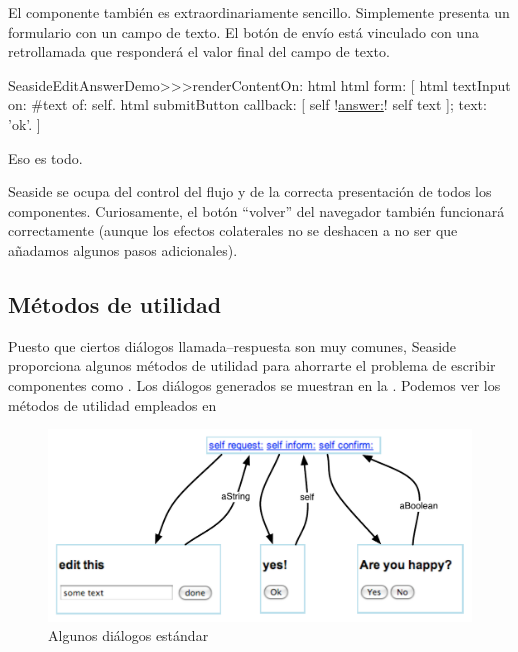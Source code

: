 \documentclass[a4paper,10pt,twoside]{book}
\begin{document}

El componente  también es extraordinariamente sencillo.
Simplemente presenta un formulario con un campo de texto.
El botón de envío está vinculado con una retrollamada que responderá el valor final del campo de texto.

\begin{code}{}
SeasideEditAnswerDemo>>>renderContentOn: html
	html form: [
		html textInput
			on: #text of: self.
		html submitButton
			callback: [ self !\underline{answer:}! self text ];
			text: 'ok'.
		]
\end{code}{}

Eso es todo.

Seaside se ocupa del control del flujo y de la correcta presentación de todos los componentes.
Curiosamente, el botón ``volver'' del navegador también funcionará correctamente (aunque los efectos colaterales no se deshacen a no ser que añadamos algunos pasos adicionales).

\subsection{Métodos de utilidad}

Puesto que ciertos diálogos llamada--respuesta son muy comunes, Seaside proporciona algunos métodos de utilidad para ahorrarte el problema de escribir componentes como .
Los diálogos generados se muestran en la .
Podemos ver los métodos de utilidad empleados en 

\begin{figure}[b]
\begin{center}
\includegraphics[width=\textwidth]{dialogs}
\caption{Algunos diálogos estándar}
\end{center}
\end{figure}
\end{document}
